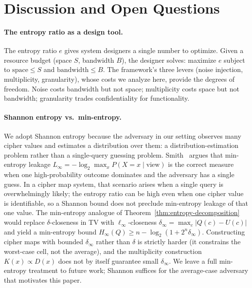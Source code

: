 \documentclass[11pt]{article}
\theoremstyle{definition}
\theoremstyle{plain}
\theoremstyle{remark}
\begin{document}
\section{Discussion and Open Questions}
\label{sec:discussion}

\paragraph{The entropy ratio as a design tool.}
The entropy ratio $e$ gives system designers a single number to
optimize.  Given a resource budget (space $S$, bandwidth $B$), the
designer solves: maximize $e$ subject to $\text{space} \leq S$ and
$\text{bandwidth} \leq B$.  The framework's three levers (noise
injection, multiplicity, granularity), whose costs we analyze here,
provide the degrees of freedom.  Noise costs bandwidth but not space;
multiplicity costs space but not bandwidth; granularity trades
confidentiality for functionality.

\paragraph{Shannon entropy vs.\ min-entropy.}
We adopt Shannon entropy because the adversary in our setting observes
many cipher values and estimates a distribution over them: a
distribution-estimation problem rather than a single-query guessing
problem.  Smith~\cite{smith2009foundations} argues that min-entropy
leakage $L_\infty = -\log_2 \max_x P(X = x \mid \mathrm{view})$ is the
correct measure when one high-probability outcome dominates and the
adversary has a single guess.  In a cipher map system, that scenario
arises when a single query is overwhelmingly likely; the entropy ratio
can be high even when one cipher value is identifiable, so a Shannon
bound does not preclude min-entropy leakage of that one value.  The
min-entropy analogue of Theorem~\ref{thm:entropy-decomposition} would
replace $\delta$-closeness in TV with $\ell_\infty$-closeness
$\delta_\infty = \max_c |Q(c) - U(c)|$ and yield a min-entropy bound
$H_\infty(Q) \geq n - \log_2(1 + 2^n \delta_\infty)$.  Constructing
cipher maps with bounded $\delta_\infty$ rather than $\delta$ is
strictly harder (it constrains the worst-case cell, not the average),
and the multiplicity construction $K(x) \propto D(x)$ does not by
itself guarantee small $\delta_\infty$.  We leave a full min-entropy
treatment to future work; Shannon suffices for the average-case
adversary that motivates this paper.
\end{document}
